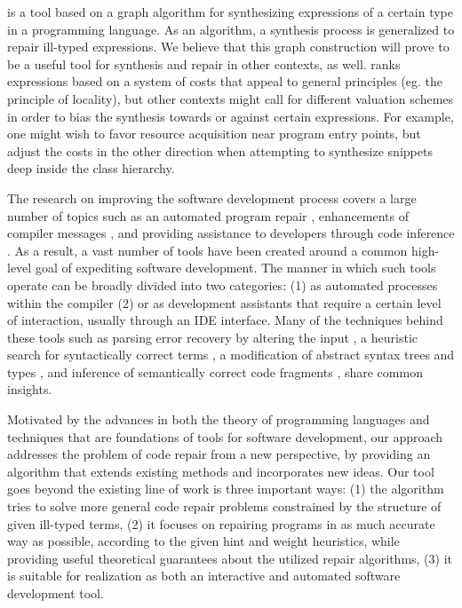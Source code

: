 \ourTool is a tool based on a graph algorithm for synthesizing expressions of a certain type in a programming language. As an algorithm, a synthesis process is generalized to repair ill-typed expressions. We believe that this graph construction will prove to be a useful tool for synthesis and repair in other contexts, as well. \ourTool ranks expressions based on a system of costs that appeal to general principles (eg. the principle of locality), but other contexts might call for different valuation schemes in order to bias the synthesis towards or against certain expressions. For example, one might wish to favor resource acquisition near program entry points, but adjust the costs in the other direction when attempting to synthesize snippets deep inside the class hierarchy.

The research on improving the software development process covers a large number of topics such as an automated program repair \cite{LeGoues:2012:ROI:2330163.2330296,WeiETAL10AutomatedFixingProgramsContracts,PeiETAL11CodebasedAutomatedProgramFixing}, enhancements of compiler messages \cite{Burke87apractical,Hammond198451,Lerner:2007:STM:1250734.1250783}, and providing assistance to developers through code inference \cite{GveroETAL13CompleteCompletionTypesWeights, MandelinetALL2005Jungloid, KneussETAL13SynthesisModuloRecursiveFunctions, KuncakETAL13ExecutingSpecificationsSynthesisConstraintSolvingInvitedTalk, PerelmanGBG12}. As a result, a vast number of tools have been created around a common high-level goal of expediting software development. The manner in which such tools operate can be broadly divided into two categories: (1) as automated processes within the compiler (2) or as development assistants that require a certain level of interaction, usually through an IDE interface. Many of the techniques behind these tools such as parsing error recovery by altering the input \cite{Burke87apractical}, a heuristic search for syntactically correct terms \cite{PerelmanGBG12}, a modification of abstract syntax trees and types \cite{Lerner:2007:STM:1250734.1250783}, and inference of semantically correct code fragments \cite{KneussETAL13SynthesisModuloRecursiveFunctions}, share common insights.

Motivated by the advances in both the theory of programming languages and techniques that are foundations of tools for software development, our approach addresses the problem of code repair from a new perspective, by providing an algorithm that extends existing methods and incorporates new ideas. Our tool goes beyond the existing line of work is three important ways: (1) the algorithm tries to solve more general code repair problems constrained by  the structure of given ill-typed terms, (2) it focuses on repairing programs in as much accurate way as possible, according to the given hint and weight heuristics, while providing useful theoretical guarantees about the utilized repair algorithms, (3) it is suitable for realization as both an interactive and automated software development tool.

